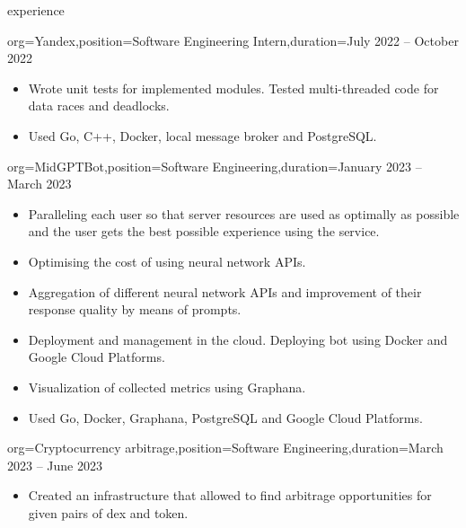 \documentclass{resume}
\begin{document}
\begin{ResumeSection}{experience}
\begin{ResumeSubsection}{org=Yandex,position={Software Engineering Intern},duration=July 2022 – October 2022}
\begin{itemize}
            \item {
                Wrote unit tests for implemented modules. Tested multi-threaded code for data races and deadlocks.
            }

            \item {
                Used Go, C++, Docker, local message broker and PostgreSQL.
            }
        \end{itemize}
    \end{ResumeSubsection}

    \begin{ResumeSubsection}{org=MidGPTBot,position={Software Engineering},duration=January 2023 – March 2023}
        \begin{itemize}
            \item {
                Paralleling each user so that server resources are used as optimally as possible and the user gets the best possible experience using the service.
            }

            \item {
                Optimising the cost of using neural network APIs.
            }

            \item {
                Aggregation of different neural network APIs and improvement of their response \- quality by means of prompts.
            }

            \item {
                Deployment and management in the cloud. Deploying bot using Docker and Google Cloud Platforms.
            }

            \item {
                Visualization of collected metrics using Graphana.
            }

            \item {
                Used Go, Docker, Graphana, PostgreSQL and Google Cloud Platforms.
            }
        \end{itemize}
    \end{ResumeSubsection}
    \begin{ResumeSubsection}{org=Cryptocurrency arbitrage,position={Software Engineering},duration=March 2023 – June 2023}
        \begin{itemize}
            \item {
                Created an infrastructure that allowed to find arbitrage opportunities for given pairs of dex and token.
            }


\end{itemize}
\end{ResumeSubsection}
\end{ResumeSection}
\end{document}

